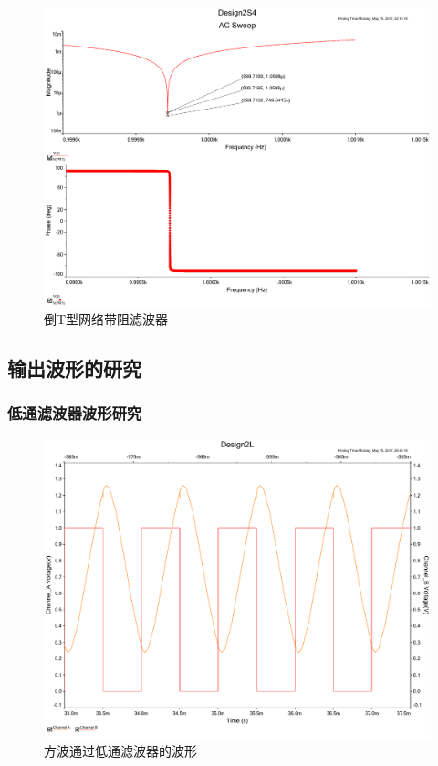 \documentclass[UTF8,a4paper]{paper}
\begin{document}
\begin{figure}
\centering
\includegraphics[width=\textwidth]{2Sinf_1.pdf}
\caption{倒T型网络带阻滤波器}
\label{SQ1}
\end{figure}
\subsection{输出波形的研究}
\subsubsection{低通滤波器波形研究}
\begin{figure}
\centering
\includegraphics[width=\textwidth]{2L.pdf}
\caption{方波通过低通滤波器的波形}
\label{BIL}
\end{figure}
\end{document}

